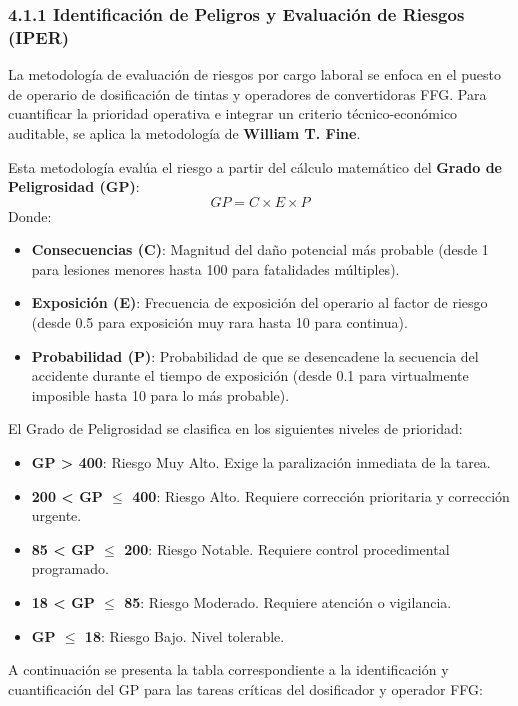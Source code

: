\documentclass[11pt, letterpaper]{article}
\begin{document}
\subsubsection{4.1.1 Identificación de Peligros y Evaluación de Riesgos (IPER)}
La metodología de evaluación de riesgos por cargo laboral se enfoca en el puesto de operario de dosificación de tintas y operadores de convertidoras FFG. Para cuantificar la prioridad operativa e integrar un criterio técnico-económico auditable, se aplica la metodología de \textbf{William T. Fine}. 

Esta metodología evalúa el riesgo a partir del cálculo matemático del \textbf{Grado de Peligrosidad (GP)}:
\begin{equation}
    GP = C \times E \times P
\end{equation}
Donde:
\begin{itemize}
    \item \textbf{Consecuencias (C)}: Magnitud del daño potencial más probable (desde 1 para lesiones menores hasta 100 para fatalidades múltiples).
    \item \textbf{Exposición (E)}: Frecuencia de exposición del operario al factor de riesgo (desde 0.5 para exposición muy rara hasta 10 para continua).
    \item \textbf{Probabilidad (P)}: Probabilidad de que se desencadene la secuencia del accidente durante el tiempo de exposición (desde 0.1 para virtualmente imposible hasta 10 para lo más probable).
\end{itemize}

El Grado de Peligrosidad se clasifica en los siguientes niveles de prioridad:
\begin{itemize}
    \item \textbf{GP > 400}: Riesgo Muy Alto. Exige la paralización inmediata de la tarea.
    \item \textbf{200 < GP $\leq$ 400}: Riesgo Alto. Requiere corrección prioritaria y corrección urgente.
    \item \textbf{85 < GP $\leq$ 200}: Riesgo Notable. Requiere control procedimental programado.
    \item \textbf{18 < GP $\leq$ 85}: Riesgo Moderado. Requiere atención o vigilancia.
    \item \textbf{GP $\leq$ 18}: Riesgo Bajo. Nivel tolerable.
\end{itemize}

A continuación se presenta la tabla correspondiente a la identificación y cuantificación del GP para las tareas críticas del dosificador y operador FFG:
\end{document}
